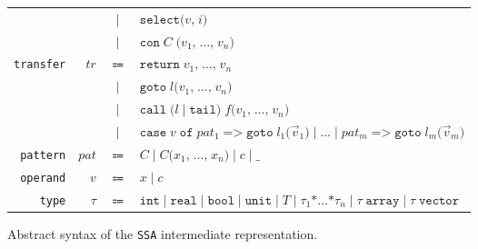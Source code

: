 \begin{figure}[htbp]
\begin{tabular}{@{}r@{\quad}r@{\;}c@{\;}l@{}}
                         &       & $\mid$      & $\texttt{select(}v\texttt{,}\;i\texttt{)}$ \\
                         &       & $\mid$      & $\texttt{con}\; C\;\texttt{(}v_1\texttt{,}\;\dots\texttt{,}\;v_n\texttt{)}$ \\[0.4em]
    \texttt{transfer}    & $tr$  & $\Coloneqq$ & $\texttt{return}\; v_1\texttt{,}\;\dots\texttt{,}\;v_n$ \\
                         &       & $\mid$      & $\texttt{goto}\; l\texttt{(}v_1\texttt{,}\;\dots\texttt{,}\;v_n\texttt{)}$ \\
                         &       & $\mid$      & $\texttt{call}\;\texttt{(}l \mid \texttt{tail}\texttt{)}\; f\texttt{(}v_1\texttt{,}\;\dots\texttt{,}\;v_n\texttt{)}$ \\
                         &       & $\mid$      & $\texttt{case}\; v \;\texttt{of}\; pat_1 \mathrel{\texttt{=>}} \texttt{goto}\; l_1\texttt{(}\vec{v}_1\texttt{)} \mathrel{\texttt{|}} \dots \mathrel{\texttt{|}} pat_m \mathrel{\texttt{=>}} \texttt{goto}\; l_m\texttt{(}\vec{v}_m\texttt{)}$ \\[0.4em]
    \texttt{pattern}     & $pat$ & $\Coloneqq$ & $C \mid C\texttt{(}x_1\texttt{,}\;\dots\texttt{,}\;x_n\texttt{)} \mid c \mid \texttt{\_}$ \\
    \texttt{operand}     & $v$   & $\Coloneqq$ & $x \mid c$ \\
    \texttt{type}        & $\tau$& $\Coloneqq$ & $\texttt{int} \mid \texttt{real} \mid \texttt{bool} \mid \texttt{unit} \mid T \mid \tau_1 \mathbin{\texttt{*}} \dots \mathbin{\texttt{*}} \tau_n \mid \tau\;\texttt{array} \mid \tau\;\texttt{vector}$
  \end{tabular}
  \caption{Abstract syntax of the \texttt{SSA} intermediate representation.}
  \label{fig:ssa_grammar}
\end{figure}




